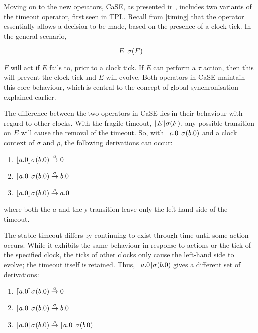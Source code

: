 Moving on to the new operators, CaSE, as presented in
\cite{norton05alg}, includes two variants of the timeout operator,
first seen in TPL.  Recall from \ref{timing} that the operator
essentially allows a decision to be made, based on the presence of a
clock tick.  In the general scenario,

\begin{equation}
\lfloor{E}\rfloor {\sigma} ({F})
\end{equation}

\noindent $F$ will act if $E$ fails to, prior to a clock tick.  If $E$
can perform a $\tau$ action, then this will prevent the clock tick and
$E$ will evolve. Both operators in CaSE maintain this core behaviour,
which is central to the concept of global synchronisation explained
earlier.

The difference between the two operators in CaSE lies in their
behaviour with regard to other clocks.  With the fragile timeout,
$\lfloor{E}\rfloor {\sigma} ({F})$, any possible transition on $E$ will cause the
removal of the timeout.  So, with $\lfloor{a.0}\rfloor {\sigma} ({b.0})$ and a clock
context of $\sigma$ and $\rho$, the following derivations can occur:

\begin{enumerate}
\item $\lfloor{a.0}\rfloor {\sigma} ({b.0}) \stackrel{a}{\rightarrow} 0$
\item $\lfloor{a.0}\rfloor {\sigma} ({b.0}) \stackrel{\sigma}{\rightarrow} b.0$
\item $\lfloor{a.0}\rfloor {\sigma} ({b.0}) \stackrel{\rho}{\rightarrow} a.0$
\end{enumerate}

\noindent where both the $a$ and the $\rho$ transition leave only the
left-hand side of the timeout.

The stable timeout differs by continuing to exist through time until
some action occurs.  While it exhibits the same behaviour in response
to actions or the tick of the specified clock, the ticks of other
clocks only cause the left-hand side to evolve; the timeout itself is
retained.  Thus, $\lceil{a.0}\rceil {\sigma} ({b.0})$ gives a different set
of derivations:

\begin{enumerate}
\item $\lceil{a.0}\rceil {\sigma} ({b.0}) \stackrel{a}{\rightarrow} 0$
\item $\lceil{a.0}\rceil {\sigma} ({b.0}) \stackrel{\sigma}{\rightarrow} b.0$
\item $\lceil{a.0}\rceil {\sigma} ({b.0}) \stackrel{\rho}{\rightarrow} \lceil{a.0}\rceil {\sigma} ({b.0})$
\end{enumerate}

